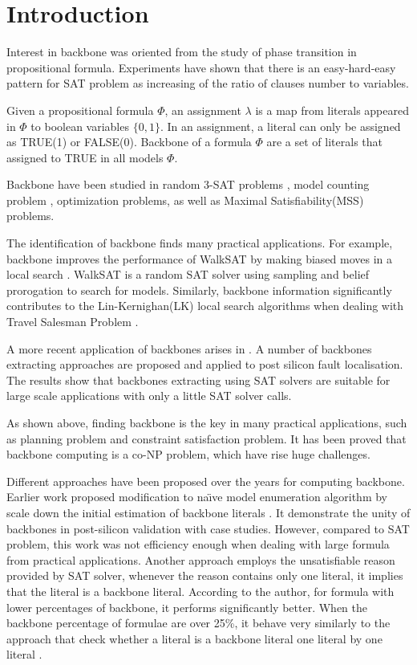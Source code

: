 
\section{Introduction}

Interest in backbone was oriented from the study of phase transition in propositional formula.
Experiments have shown that there is an easy-hard-easy pattern for SAT problem as increasing of the ratio of clauses number to variables.

Given a propositional formula $\Phi$, an assignment $\lambda$ is a map from literals appeared in $\Phi$ to boolean variables $\{0,1\}$. In an assignment, a literal can only be assigned as TRUE(1) or FALSE(0).
Backbone of a formula $\Phi$ are a set of literals that assigned to TRUE in all models $\Phi$\cite{BCJ2001,KPJ2005,MJML2010}.

Backbone have been studied in random 3-SAT problems \cite{DOG2001}, model counting problem \cite{IMM2016}, optimization problems\cite{CJG2001,KPS2005,WTS2001}, as well as Maximal Satisfiability(MSS) problems\cite{MM2005}.

The identification of backbone finds many practical applications. For example, backbone improves the performance of WalkSAT \cite{SBK1993} by making biased moves in a local search \cite{ZWR2003}. WalkSAT is a random SAT solver using sampling and belief prorogation \cite{MAR2007} to search for models. Similarly, backbone information significantly contributes to the Lin-Kernighan(LK) local search algorithms when dealing with Travel Salesman Problem \cite{ZWL2005}.

A more recent application of backbones arises in \cite{Z11}. A number of backbones extracting approaches are proposed and applied to post silicon fault localisation. The results show that backbones extracting using SAT solvers are suitable for large scale applications with only a little SAT solver calls.

As shown above, finding backbone is the key in many practical applications, such as planning problem and constraint satisfaction problem. It has been proved that backbone computing is a co-NP problem\cite{Jan10}, which have rise huge challenges.

Different approaches have been proposed over the years for computing backbone. Earlier work proposed modification to na\"{\i}ve model enumeration algorithm by scale down the initial estimation of backbone literals \cite{Z11}. It demonstrate the unity of backbones in post-silicon validation with case studies. However, compared to SAT problem, this work was not efficiency enough when dealing with large formula from practical applications. Another approach employs the unsatisfiable reason provided by SAT solver, whenever the reason contains only one literal, it implies that the literal is a backbone literal. According to the author, for formula with lower percentages of backbone, it performs significantly better. When the backbone percentage of formulae are over 25\%, it behave very similarly to the approach that check whether a literal is a backbone literal one literal by one literal \cite{MJML2010}.


